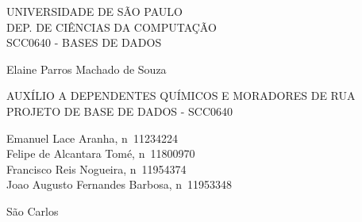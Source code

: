 \documentclass[article,	12pt, oneside, 	a4paper, english, brazil
]{abntex2}
\begin{document}
\pagestyle{meuestilo}

\begin{capa}

    \begin{center}
        {\MakeUppercase{\Large Universidade de São Paulo}}\\
        {\MakeUppercase{\large Dep. de Ciências da Computação}}\\
        {\MakeUppercase{\large SCC0640 - Bases de Dados}}

        \vspace{2cm}

        \begin{flushright}
            Elaine Parros Machado de Souza
        \end{flushright}


        \vspace{4cm}

        {\MakeUppercase{\large Auxílio a Dependentes Químicos e Moradores de Rua}}
        \\[0.125cm]
        {\MakeUppercase {\normalsize Projeto de Base de Dados - SCC0640 }}\\[3cm]
    \end{center}

    \begin{flushright}
        {\large	Emanuel Lace Aranha, n\textdegree ~11234224}\\
        {\large	Felipe de Alcantara Tomé, n\textdegree ~11800970}\\
        {\large	Francisco Reis Nogueira, n\textdegree ~11954374}\\
        {\large	Joao Augusto Fernandes Barbosa, n\textdegree ~11953348}\\

    \end{flushright}

    \begin{center}
        \vfill
        São Carlos \\
        \the\year  %

    \end{center}
\end{capa}


\vspace{3cm}
\end{document}
